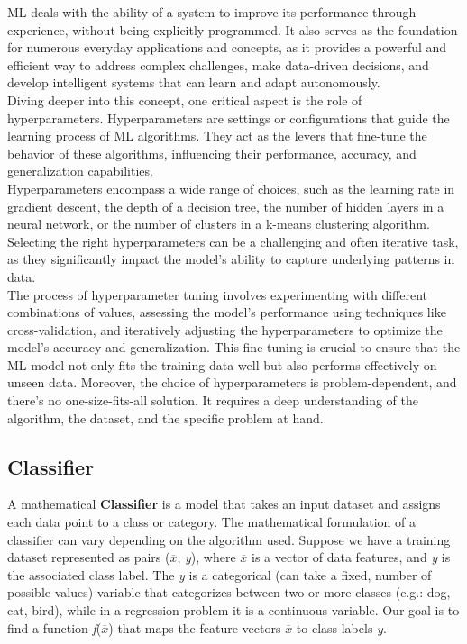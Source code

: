 ML deals with the ability of a system to improve its performance through experience, without being explicitly programmed.
It also serves as the foundation for numerous everyday applications and concepts, 
as it provides a powerful and efficient way to address complex challenges, make data-driven decisions, 
and develop intelligent systems that can learn and adapt autonomously.\\
Diving deeper into this concept, one critical aspect is the role of hyperparameters. 
Hyperparameters are settings or configurations that guide the learning process of ML algorithms. 
They act as the levers that fine-tune the behavior of these algorithms, influencing their performance, accuracy, and generalization capabilities.\\
Hyperparameters encompass a wide range of choices, such as the learning rate in gradient descent, the depth of a decision tree, the number of hidden layers in a neural network, or the number of clusters in a k-means clustering algorithm. 
Selecting the right hyperparameters can be a challenging and often iterative task, as they significantly impact the model's ability to capture underlying patterns in data.\\
The process of hyperparameter tuning involves experimenting with different combinations of values, assessing the model's performance using techniques like cross-validation, and iteratively adjusting the hyperparameters to optimize the model's accuracy and generalization. 
This fine-tuning is crucial to ensure that the ML model not only fits the training data well but also performs effectively on unseen data.
Moreover, the choice of hyperparameters is problem-dependent, and there's no one-size-fits-all solution. 
It requires a deep understanding of the algorithm, the dataset, and the specific problem at hand.

\subsection{Classifier}
\label{subsec:classifier}

A mathematical \textbf{Classifier} is a model that takes an input dataset and assigns each data point to a class or category. 
The mathematical formulation of a classifier can vary depending on the algorithm used. 
Suppose we have a training dataset represented as pairs (\textit{$\overline{x}$}, \textit{y}), where \textit{$\overline{x}$} is a vector of data features, and \textit{y} is the associated class label.
The \textit{y} is a categorical (can take a fixed, number of possible values) variable that categorizes between two or more classes (e.g.: dog, cat, bird), while in a regression problem it is a continuous variable.
Our goal is to find a function \textit{f}(\textit{$\overline{x}$}) that maps the feature vectors \textit{$\overline{x}$} to class labels \textit{y}. \\

